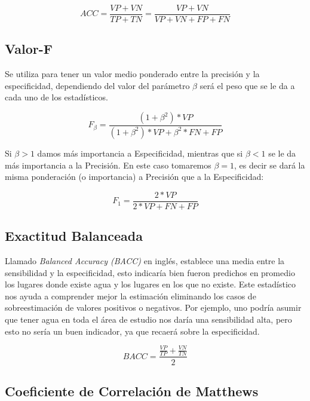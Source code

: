 \documentclass[10pt,a4paper, twoside]{report}
\begin{document}
\begin{equation}
ACC=\frac{VP+VN}{TP+TN}=\frac{VP+VN}{VP+VN+FP+FN}
\end{equation}

\subsection{Valor-F}
    
Se utiliza para tener un valor medio ponderado entre la precisión y la especificidad, dependiendo del  valor del parámetro $\beta$ será el peso que se le da a cada uno de los estadísticos.

\begin{equation}
F_{\beta}=\frac{(1+\beta^{2})*VP}{(1+\beta^{2})*VP + \beta^{2}*FN + FP }
\end{equation}

Si $\beta > 1$ damos más importancia a Especificidad, mientras que si $\beta < 1$ se le da más importancia a la Precisión. 
En este caso tomaremos $\beta = 1$, es decir se dará la misma ponderación (o importancia) a Precisión que a la Especificidad:

\begin{equation}
F_{1}=\frac{2*VP}{2 * VP + FN + FP }
\end{equation}

\subsection{Exactitud Balanceada}

Llamado\textit{ Balanced Accuracy (BACC)} en inglés, establece una media entre la sensibilidad y la especificidad, esto indicaría bien fueron predichos en promedio los lugares donde existe agua y los lugares en los que no existe. Este estadístico nos ayuda a comprender mejor la estimación eliminando los casos de sobreestimación de valores positivos o negativos. Por ejemplo, uno podría asumir que tener agua en toda el área de estudio nos daría una sensibilidad alta, pero esto no sería un buen indicador, ya que recaerá sobre la especificidad.

\begin{equation}
BACC=\frac{\frac{VP}{TP}+\frac{VN}{TN}}{2}
\end{equation}


\subsection{Coeficiente de Correlación de Matthews}
\label{defMatthews}
\end{document}
